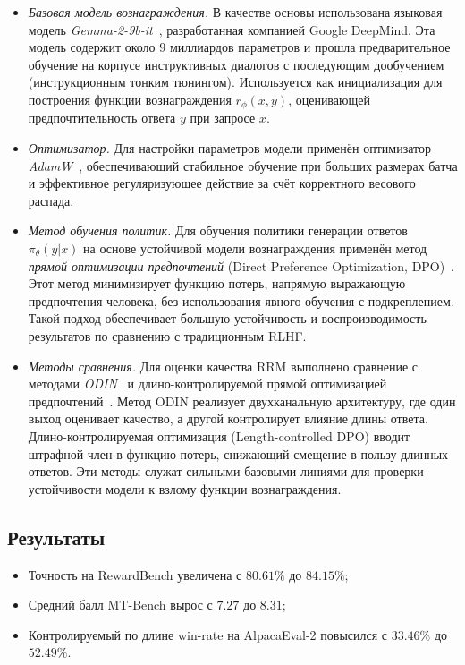 \begin{itemize}
  \item \emph{Базовая модель вознаграждения.}  
  В качестве основы использована языковая модель \emph{Gemma-2-9b-it}~\cite{team2024gemma}, разработанная компанией Google DeepMind.  
  Эта модель содержит около $9$ миллиардов параметров и прошла предварительное обучение на корпусе инструктивных диалогов с последующим дообучением (инструкционным тонким тюнингом).  
  Используется как инициализация для построения функции вознаграждения $r_\phi(x, y)$, оценивающей предпочтительность ответа $y$ при запросе $x$. 

  \item \emph{Оптимизатор.}  
  Для настройки параметров модели применён оптимизатор \emph{AdamW}~\cite{loshchilov2019adamw}, обеспечивающий стабильное обучение при больших размерах батча и эффективное регуляризующее действие за счёт корректного весового распада.

  \item \emph{Метод обучения политик.}  
  Для обучения политики генерации ответов $\pi_\theta(y|x)$ на основе устойчивой модели вознаграждения применён метод \emph{прямой оптимизации предпочтений} (Direct Preference Optimization, DPO)~\cite{rafailov2024direct}.  
  Этот метод минимизирует функцию потерь, напрямую выражающую предпочтения человека, без использования явного обучения с подкреплением.  
  Такой подход обеспечивает большую устойчивость и воспроизводимость результатов по сравнению с традиционным RLHF.

  \item \emph{Методы сравнения.}  
  Для оценки качества RRM выполнено сравнение с методами \emph{ODIN}~\cite{chen2023odin} и длино-контролируемой прямой оптимизацией предпочтений~\cite{park2024lengthdpo}.  
  Метод ODIN реализует двухканальную архитектуру, где один выход оценивает качество, а другой контролирует влияние длины ответа.  
  Длино-контролируемая оптимизация (Length-controlled DPO) вводит штрафной член в функцию потерь, снижающий смещение в пользу длинных ответов.  
  Эти методы служат сильными базовыми линиями для проверки устойчивости модели к взлому функции вознаграждения.
\end{itemize}

\subsection{Результаты}

\begin{itemize}
  \item Точность на RewardBench увеличена с $80.61\%$ до $84.15\%$;
  \item Средний балл MT-Bench вырос с $7.27$ до $8.31$;
  \item Контролируемый по длине win-rate на AlpacaEval-2 повысился с $33.46\%$ до $52.49\%$.
\end{itemize}
